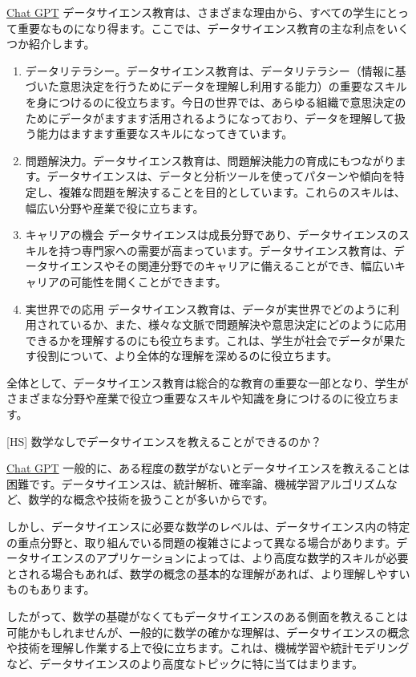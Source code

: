 \documentclass[
]{book}
\theoremstyle{definition}
\theoremstyle{definition}
\theoremstyle{definition}
\theoremstyle{definition}
\theoremstyle{remark}
\begin{document}
\protect\hyperlink{chatgpt}{Chat GPT} データサイエンス教育は、さまざまな理由から、すべての学生にとって重要なものになり得ます。ここでは、データサイエンス教育の主な利点をいくつか紹介します。

\begin{enumerate}
\def\labelenumi{\arabic{enumi}.}
\item
  データリテラシー。データサイエンス教育は、データリテラシー（情報に基づいた意思決定を行うためにデータを理解し利用する能力）の重要なスキルを身につけるのに役立ちます。今日の世界では、あらゆる組織で意思決定のためにデータがますます活用されるようになっており、データを理解して扱う能力はますます重要なスキルになってきています。
\item
  問題解決力。データサイエンス教育は、問題解決能力の育成にもつながります。データサイエンスは、データと分析ツールを使ってパターンや傾向を特定し、複雑な問題を解決することを目的としています。これらのスキルは、幅広い分野や産業で役に立ちます。
\item
  キャリアの機会 データサイエンスは成長分野であり、データサイエンスのスキルを持つ専門家への需要が高まっています。データサイエンス教育は、データサイエンスやその関連分野でのキャリアに備えることができ、幅広いキャリアの可能性を開くことができます。
\item
  実世界での応用 データサイエンス教育は、データが実世界でどのように利用されているか、また、様々な文脈で問題解決や意思決定にどのように応用できるかを理解するのにも役立ちます。これは、学生が社会でデータが果たす役割について、より全体的な理解を深めるのに役立ちます。
\end{enumerate}

全体として、データサイエンス教育は総合的な教育の重要な一部となり、学生がさまざまな分野や産業で役立つ重要なスキルや知識を身につけるのに役立ちます。

{[}HS{]} 数学なしでデータサイエンスを教えることができるのか？

\protect\hyperlink{chatgpt}{Chat GPT} 一般的に、ある程度の数学がないとデータサイエンスを教えることは困難です。データサイエンスは、統計解析、確率論、機械学習アルゴリズムなど、数学的な概念や技術を扱うことが多いからです。

しかし、データサイエンスに必要な数学のレベルは、データサイエンス内の特定の重点分野と、取り組んでいる問題の複雑さによって異なる場合があります。データサイエンスのアプリケーションによっては、より高度な数学的スキルが必要とされる場合もあれば、数学の概念の基本的な理解があれば、より理解しやすいものもあります。

したがって、数学の基礎がなくてもデータサイエンスのある側面を教えることは可能かもしれませんが、一般的に数学の確かな理解は、データサイエンスの概念や技術を理解し作業する上で役に立ちます。これは、機械学習や統計モデリングなど、データサイエンスのより高度なトピックに特に当てはまります。
\end{document}
